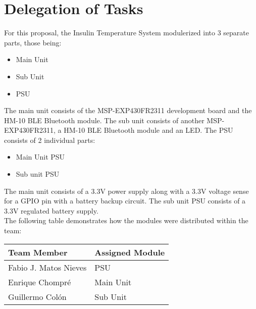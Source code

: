 \section{Delegation of Tasks}
For this proposal, the Insulin Temperature System modulerized into 3 separate parts, those being:
\begin{itemize}
  \item Main Unit
  \item Sub Unit
  \item PSU
\end{itemize}
The main unit consists of the MSP-EXP430FR2311 development board and the HM-10 BLE Bluetooth module. The sub unit consists of another MSP-EXP430FR2311, a HM-10 BLE Bluetooth module and an LED. The PSU consists of 2 individual parts:
\begin{itemize}
  \item Main Unit PSU
  \item Sub unit PSU
\end{itemize}
The main unit consists of a 3.3\si{\V} power supply along with a 3.3\si{\V} voltage sense for a GPIO pin with a battery backup circuit.  The sub unit PSU consists of a 3.3\si{\V} regulated battery supply.\\
The following table demonstrates how the modules were distributed within the team:
\begin{center}
\begin{tabularx}{\textwidth}{|X|X|}
 \hline
 Team Member & Assigned Module\\
 \hline
 Fabio J. Matos Nieves & PSU\\
 \hline
 Enrique Chompré & Main Unit\\
 \hline
 Guillermo Colón & Sub Unit\\
 \hline
\end{tabularx}
\end{center}

